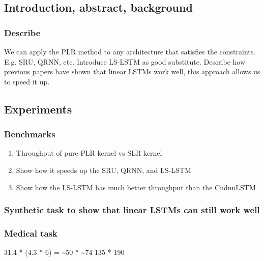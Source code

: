 \documentclass[11pt]{article}
\begin{document}
\subsection{Introduction, abstract, background}
\label{sec-3-1}
\subsubsection{Describe}
\label{sec-3-1-1}
We can apply the PLR method to any architecture that satisfies the 
constraints. E.g. SRU, QRNN, etc. Introduce LS-LSTM as good substitute.
Describe how previous papers have shown that linear LSTMs work well, this
approach allows us to speed it up.
\subsection{Experiments}
\label{sec-3-2}
\subsubsection{Benchmarks}
\label{sec-3-2-1}
\begin{enumerate}
\item Throughput of pure PLR kernel vs SLR kernel
\label{sec-3-2-1-1}
\item Show how it speeds up the SRU, QRNN, and LS-LSTM
\label{sec-3-2-1-2}
\item Show how the LS-LSTM has much better throughput than the CudnnLSTM
\label{sec-3-2-1-3}
\end{enumerate}
\subsubsection{Synthetic task to show that linear LSTMs can still work well}
\label{sec-3-2-2}
\subsubsection{Medical task}
\label{sec-3-2-3}



31.4 * (4.3 * 6) = 
\textasciitilde{}50 * \textasciitilde{}74
135 * 190
\end{document}
